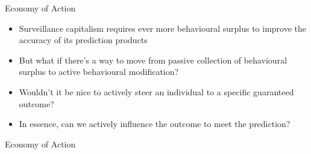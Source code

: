 \documentclass[aspectratio=169]{beamer}
\begin{document}
    {%
    \begin{frame}{Economy of Action}
        \begin{itemize}
            \item Surveillance capitalism requires ever more behavioural
                surplus to improve the accuracy of its prediction products
            \item But what if there's a way to move from passive collection of
                behavioural surplus to active behavioural modification?
            \pause{}
            \item Wouldn't it be nice to actively steer an individual to a
                specific guaranteed outcome?
            \pause{}
            \item In essence, can we actively influence the outcome to meet the
                prediction?
        \end{itemize}
    \end{frame}
    }

    {%
    \begin{frame}
        \begin{titlebox}
            \centering
            {Economy of Action}
        \end{titlebox}
    \end{frame}
    }
\end{document}
